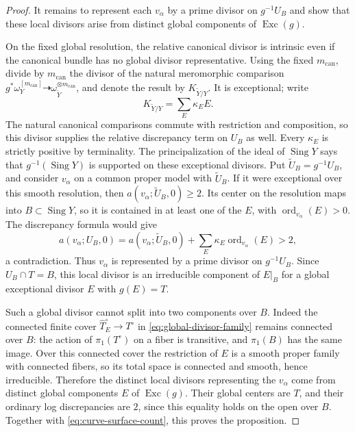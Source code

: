 \documentclass[11pt]{amsart}
\theoremstyle{definition}
\theoremstyle{remark}
\numberwithin{equation}{section}
\DeclareMathOperator{\Exc}{Exc}
\DeclareMathOperator{\Sing}{Sing}
\DeclareMathOperator{\ord}{ord}
\begin{document}
\begin{proof}
It remains to represent each \(v_\alpha\) by a prime divisor on
\(g^{-1}U_B\) and show that these local divisors arise from distinct
global components of \(\Exc(g)\).

On the fixed global resolution, the relative canonical divisor is
intrinsic even if the canonical bundle has no global divisor
representative.  Using the fixed \(m_{\mathrm{can}}\), divide by
\(m_{\mathrm{can}}\) the divisor of the
natural meromorphic comparison
\(g^*\omega_Y^{[m_{\mathrm{can}}]}\dashrightarrow
\omega_{\widetilde Y}^{\otimes m_{\mathrm{can}}}\), and denote the
result by \(K_{\widetilde Y/Y}\).  It is exceptional; write
\[
 K_{\widetilde Y/Y}=\sum_E\kappa_EE.
\]
The natural canonical comparisons commute with restriction and
composition, so this divisor supplies the relative discrepancy term
on \(U_B\) as well.
Every \(\kappa_E\) is strictly positive by terminality.  The
principalization of the ideal of \(\Sing Y\) says that
\(g^{-1}(\Sing Y)\) is supported on these exceptional divisors.
Put \(\widetilde U_B=g^{-1}U_B\), and consider \(v_\alpha\) on a
common proper model with \(\widetilde U_B\).  If it were exceptional
over this smooth resolution, then \(a(v_\alpha;\widetilde U_B,0)\ge2\).
Its center on the
resolution maps into \(B\subset\Sing Y\), so it is contained in at
least one of the \(E\), with \(\ord_{v_\alpha}(E)>0\).
The discrepancy formula would give
\[
 a(v_\alpha;U_B,0)
 =a(v_\alpha;\widetilde U_B,0)
    +\sum_E\kappa_E\ord_{v_\alpha}(E)>2,
\]
a contradiction.  Thus \(v_\alpha\) is represented by a prime
divisor on \(g^{-1}U_B\).  Since \(U_B\cap T=B\), this local divisor
is an irreducible component of \(E|_B\) for a global exceptional
divisor \(E\) with \(g(E)=T\).

Such a global divisor cannot split into two components over \(B\).
Indeed the connected finite cover \(\widehat T_E^\circ\to T^\circ\) in
\eqref{eq:global-divisor-family} remains connected over \(B\):
the action of \(\pi_1(T^\circ)\) on a fiber is transitive, and
\(\pi_1(B)\) has the same image.  Over this connected cover the
restriction of \(E\) is a smooth proper family with connected
fibers, so its total space is connected and smooth, hence
irreducible.  Therefore the distinct local divisors representing
the \(v_\alpha\) come from distinct global components \(E\) of
\(\Exc(g)\).  Their global centers are \(T\), and their ordinary
log discrepancies are \(2\), since this equality holds on the
open over \(B\).  Together with \eqref{eq:curve-surface-count},
this proves the proposition.
\end{proof}
\end{document}

